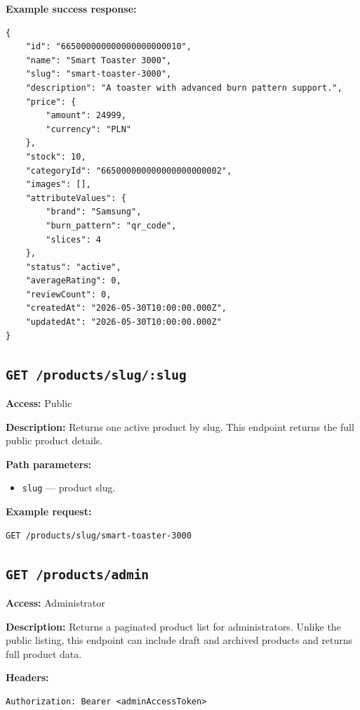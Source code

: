 \pagebreak
\textbf{Example success response:}

\begin{verbatim}
{
    "id": "665000000000000000000010",
    "name": "Smart Toaster 3000",
    "slug": "smart-toaster-3000",
    "description": "A toaster with advanced burn pattern support.",
    "price": {
        "amount": 24999,
        "currency": "PLN"
    },
    "stock": 10,
    "categoryId": "665000000000000000000002",
    "images": [],
    "attributeValues": {
        "brand": "Samsung",
        "burn_pattern": "qr_code",
        "slices": 4
    },
    "status": "active",
    "averageRating": 0,
    "reviewCount": 0,
    "createdAt": "2026-05-30T10:00:00.000Z",
    "updatedAt": "2026-05-30T10:00:00.000Z"
}
\end{verbatim}

\subsection{\texttt{GET /products/slug/:slug}}

\textbf{Access:} Public

\textbf{Description:} Returns one active product by slug. This endpoint returns the full public product details.

\textbf{Path parameters:}

\begin{itemize}
    \item \texttt{slug} --- product slug.
\end{itemize}

\textbf{Example request:}

\begin{verbatim}
GET /products/slug/smart-toaster-3000
\end{verbatim}

\subsection{\texttt{GET /products/admin}}

\textbf{Access:} Administrator

\textbf{Description:} Returns a paginated product list for administrators. Unlike the public listing, this endpoint can include draft and archived products and returns full product data.

\textbf{Headers:}

\begin{verbatim}
Authorization: Bearer <adminAccessToken>
\end{verbatim}

